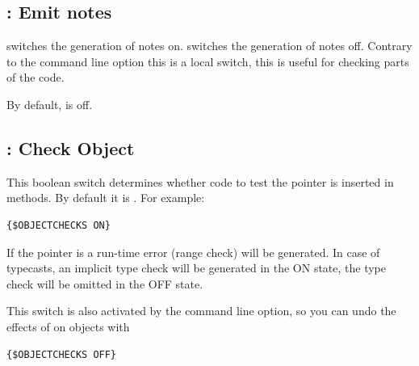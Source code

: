 \subsection{ : Emit notes}

 switches the generation of notes on.
 switches the generation of notes off.
Contrary to the command line option  this is a local switch,
this is useful for checking parts of the code.

By default,  is off.

\subsection{ : Check Object}
This boolean switch determines whether code to test the  
pointer is inserted in methods. By default it is . For example:
\begin{verbatim}
{$OBJECTCHECKS ON}
\end{verbatim}
If the  pointer is  a run-time error  
(range check) will be generated. 
In case of typecasts, an implicit type check will be generated in the ON state, 
the type check will be omitted in the OFF state.

This switch is also activated by the  command line option,
so you can undo the effects of  on objects with  
\begin{verbatim}
{$OBJECTCHECKS OFF}
\end{verbatim}
  
